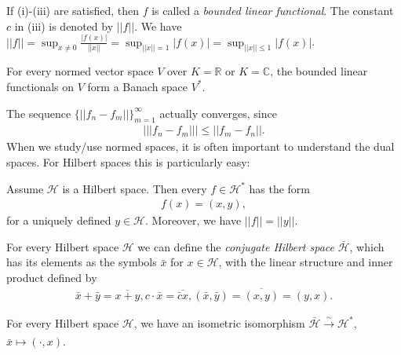 If (i)-(iii) are satisfied, then \(f\) is called a \emph{bounded linear functional}. The constant \(c\) in (iii) is denoted by \(||f||\).
We have \(||f||=\sup_{x\neq0} \frac{|f(x)|}{||x||} = \sup_{||x||=1} |f(x)| = \sup_{||x||\leq 1}|f(x)|\).

\begin{proposition}
    For every normed vector space \(V\) over \(K=\mathbb{R}\) or \(K=\mathbb{C}\), the bounded linear functionals on \(V\) form a 
    Banach space \(V^*\).
\end{proposition}
\begin{remark}
    The sequence \(\{||f_n - f_m ||\}^{\infty}_{m=1}\) actually converges, since
    \begin{align*}
        \Big\vert ||f_n-f_m|| \Big\vert \leq ||f_m-f_n||.
    \end{align*}
    When we study/use normed spaces, it is often important to understand the dual spaces. For Hilbert spaces this is particularly easy:
\end{remark}
\begin{theorem}[Riesz]
    Assume \(\mathcal{H}\) is a Hilbert space. Then every \(f\in\mathcal{H}^*\) has the form 
    \begin{align*}
        f(x) = (x,y),
    \end{align*}
    for a uniquely defined \(y\in\mathcal{H}\). Moreover, we have \(||f||=||y||\).
\end{theorem}

For every Hilbert space \(\mathcal{H}\) we can define the \emph{conjugate Hilbert space} \(\bar{\mathcal{H}}\), which has its elements as 
the symbols \(\bar{x}\) for \(x\in\mathcal{H}\), with the linear structure and inner product defined by 
\begin{align*}
    \bar{x} + \bar{y} = \overline{x+y}, c\cdot \bar{x} = \overline{\bar{c}x}, (\bar{x}, \bar{y}) = \overline{(x,y)} = (y,x).
\end{align*}
\begin{corollary}
    For every Hilbert space \(\mathcal{H}\), we have an isometric isomorphism \(\bar{\mathcal{H}} \xrightarrow[ ]{ \sim} \mathcal{H}^*\), 
    \(\bar{x}\mapsto (\cdot, x)\).
\end{corollary}
